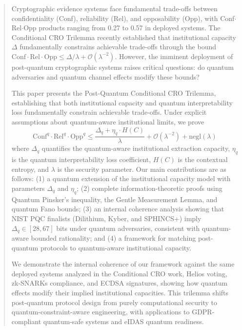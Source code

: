 \documentclass{ieeeaccess}
\begin{document}
\begin{abstract}
Cryptographic evidence systems face fundamental trade-offs between confidentiality (Conf), reliability (Rel), and opposability (Opp), with Conf$\cdot$Rel$\cdot$Opp products ranging from 0.27 to 0.57 in deployed systems. The Conditional CRO Trilemma recently established that institutional capacity $\Delta$ fundamentally constrains achievable trade-offs through the bound $\text{Conf}\cdot\text{Rel}\cdot\text{Opp} \leq \Delta/\lambda + \mathcal{O}(\lambda^{-2})$. However, the imminent deployment of post-quantum cryptographic systems raises critical questions: do quantum adversaries and quantum channel effects modify these bounds?

This paper presents the Post-Quantum Conditional CRO Trilemma, establishing that both institutional capacity and quantum interpretability loss fundamentally constrain achievable trade-offs. Under explicit assumptions about quantum-aware institutional limits, we prove
\[
\text{Conf}^q \cdot \text{Rel}^q \cdot \text{Opp}^q \leq \frac{\Delta_q + \eta_q \cdot H(C)}{\lambda} + \mathcal{O}(\lambda^{-2}) + \text{negl}(\lambda)
\]
where $\Delta_q$ quantifies the quantum-aware institutional extraction capacity, $\eta_q$ is the quantum interpretability loss coefficient, $H(C)$ is the contextual entropy, and $\lambda$ is the security parameter. Our main contributions are as follows: (1) a quantum extension of the institutional capacity model with parameters $\Delta_q$ and $\eta_q$; (2) complete information-theoretic proofs using Quantum Pinsker's inequality, the Gentle Measurement Lemma, and quantum Fano bounds; (3) an internal coherence analysis showing that NIST PQC finalists (Dilithium, Kyber, and SPHINCS+) imply $\Delta_q \in [28, 67]$ bits under quantum adversaries, consistent with quantum-aware bounded rationality; and (4) a framework for matching post-quantum protocols to quantum-aware institutional capacity.

We demonstrate the internal coherence of our framework against the same deployed systems analyzed in the Conditional CRO work, Helios voting, zk-SNARKs compliance, and ECDSA signatures, showing how quantum effects modify their implied institutional capacities. This trilemma shifts post-quantum protocol design from purely computational security to quantum-constraint-aware engineering, with applications to GDPR-compliant quantum-safe systems and eIDAS quantum readiness.
\end{abstract}
\end{document}
